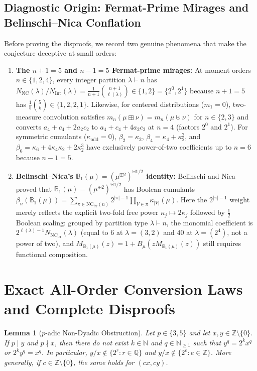 \documentclass[11pt,a4paper]{article}
\newtheorem{lemma}[theorem]{Lemma}
\theoremstyle{definition}
\theoremstyle{remark}
\newcommand{\NC}{\mathrm{NC}}
\newcommand{\NCirr}{\mathrm{NC}_{\mathrm{irr}}}
\newcommand{\IntP}{\mathrm{Int}}
\newcommand{\BP}{\mathbb{B}_1}
\begin{document}
\subsection{Diagnostic Origin: Fermat-Prime Mirages and Belinschi--Nica Conflation}
Before proving the disproofs, we record two genuine phenomena that make the conjecture deceptive at small orders:
\begin{enumerate}
  \item[(1)] \textbf{The $n+1 = 5$ and $n-1 = 5$ Fermat-prime mirages:} At moment orders $n \in \{1, 2, 4\}$, every integer partition $\lambda \vdash n$ has $N_{\NC}(\lambda)/N_{\IntP}(\lambda) = \frac{1}{n+1}\binom{n+1}{\ell(\lambda)} \in \{1, 2\} = \{2^0, 2^1\}$ because $n+1 = 5$ has $\frac{1}{5}\binom{5}{k} \in \{1, 2, 2, 1\}$. Likewise, for centered distributions ($m_1 = 0$), two-measure convolution satisfies $m_n(\mu \boxplus \nu) = m_n(\mu \uplus \nu)$ for $n \in \{2, 3\}$ and converts $a_4 + c_4 + 2 a_2 c_2$ to $a_4 + c_4 + 4 a_2 c_2$ at $n = 4$ (factors $2^0$ and $2^1$). For symmetric cumulants ($\kappa_{\text{odd}} = 0$), $\beta_2 = \kappa_2$, $\beta_4 = \kappa_4 + \kappa_2^2$, and $\beta_6 = \kappa_6 + 4\kappa_4\kappa_2 + 2\kappa_2^3$ have exclusively power-of-two coefficients up to $n = 6$ because $n - 1 = 5$.
  \item[(2)] \textbf{Belinschi--Nica's $\BP(\mu) = (\mu^{\boxplus 2})^{\uplus 1/2}$ identity:} Belinschi and Nica \cite{BelinschiNica2008} proved that $\BP(\mu) = (\mu^{\boxplus 2})^{\uplus 1/2}$ has Boolean cumulants $\beta_n(\BP(\mu)) = \sum_{\pi \in \NCirr(n)} 2^{|\pi|-1} \prod_{V \in \pi} \kappa_{|V|}(\mu)$. Here the $2^{|\pi|-1}$ weight merely reflects the explicit two-fold free power $\kappa_j \mapsto 2\kappa_j$ followed by $\frac{1}{2}$ Boolean scaling: grouped by partition type $\lambda \vdash n$, the monomial coefficient is $2^{\ell(\lambda)-1} N_{\NCirr}(\lambda)$ (equal to $6$ at $\lambda = (3,2)$ and $40$ at $\lambda = (2^4)$, not a power of two), and $M_{\BP(\mu)}(z) = 1 + B_\mu(z M_{\BP(\mu)}(z))$ still requires functional composition.
\end{enumerate}

\section{Exact All-Order Conversion Laws and Complete Disproofs}

\begin{lemma}[$p$-adic Non-Dyadic Obstruction]\label{lem:padic}
Let $p \in \{3, 5\}$ and let $x, y \in \mathbb{Z} \setminus \{0\}$. If $p \mid y$ and $p \nmid x$, then there do not exist $k \in \mathbb{N}$ and $q \in \mathbb{N}_{\ge 1}$ such that $y^q = 2^k x^q$ or $2^k y^q = x^q$. In particular, $y/x \notin \{2^r : r \in \mathbb{Q}\}$ and $y/x \notin \{2^e : e \in \mathbb{Z}\}$. More generally, if $c \in \mathbb{Z} \setminus \{0\}$, the same holds for $(c x, c y)$.
\end{lemma}
\end{document}
